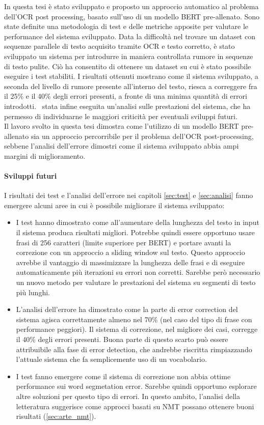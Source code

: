 In questa tesi è stato sviluppato e proposto un approccio automatico al problema dell'OCR post processing, basato sull'uso di un modello BERT pre-allenato. Sono state definite una metodologia di test e delle metriche apposite per valutare le performance del sistema sviluppato. Data la difficoltà nel trovare un dataset con sequenze parallele di testo acquisito tramite OCR e testo corretto, è stato sviluppato un sistema per introdurre in maniera controllata rumore in sequenze di testo pulite. Ciò ha consentito di ottenere un dataset su cui è stato possibile eseguire i test stabiliti. I risultati ottenuti mostrano come il sistema sviluppato, a seconda del livello di rumore presente all'interno del testo, riesca a correggere fra il 25\% e il 40\% degli errori presenti, a fronte di una minima quantità di errori introdotti. \E\ stata infine eseguita un'analisi sulle prestazioni del sistema, che ha permesso di individuarne le maggiori criticità per eventuali sviluppi futuri.\\
Il lavoro svolto in questa tesi dimostra come l'utilizzo di un modello BERT pre-allenato sia un approccio percorribile per il problema dell'OCR post-processing, sebbene l'analisi dell'errore dimostri come il sistema sviluppato abbia ampi margini di miglioramento.

\paragraph{Sviluppi futuri} I risultati dei test e l'analisi dell'errore nei capitoli \ref{sec:test} e \ref{sec:analisi} fanno emergere alcuni aree in cui è possibile migliorare il sistema sviluppato:

\begin{itemize}
\item I test hanno dimostrato come all'aumentare della lunghezza del testo in input il sistema produca risultati migliori. Potrebbe quindi essere opportuno usare frasi di 256 caratteri (limite superiore per BERT) e portare avanti la correzione con un approccio a sliding window sul testo. Questo approccio avrebbe il vantaggio di massimizzare la lunghezza delle frasi e di eseguire automaticamente più iterazioni su errori non corretti. Sarebbe però necessario un nuovo metodo per valutare le prestazioni del sistema su segmenti di testo più lunghi.

\item L'analisi dell'errore ha dimostrato come la parte di error correction del sistema agisca correttamente almeno nel 70\% (nel caso del tipo di frase con performance peggiori). Il sistema di correzione, nel migliore dei casi, corregge il 40\% degli errori presenti. Buona parte di questo scarto può essere attribuibile alla fase di error detection, che andrebbe riscritta rimpiazzando l'attuale sistema che fa semplicemente uso di un vocabolario.

\item I test fanno emergere come il sistema di correzione non abbia ottime performance sui word segmetation error. Sarebbe quindi opportuno esplorare altre soluzioni per questo tipo di errori. In questo ambito, l'analisi della letteratura suggerisce come approcci basati su NMT possano ottenere buoni risultati (\autoref{sec:arte_nmt}).
\end{itemize}